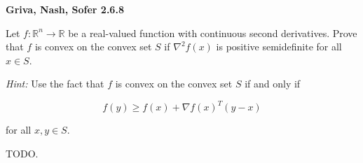 \textbf{Griva, Nash, Sofer 2.6.8}

Let $f: \mathbb{R}^n \to \mathbb{R}$ be a real-valued function with continuous second 
derivatives.  Prove that $f$ is convex on the convex set $S$ if $\nabla^2 f(x)$ is 
positive semidefinite for all $x \in S$.

\textit{Hint: } Use the fact that $f$ is convex on the convex set $S$ if and only if

$$
  f(y) \ge f(x) + \nabla f(x)^T (y - x)
$$

for all $x, y \in S$.


\begin{solution}
  TODO.
  \ \\
\end{solution}